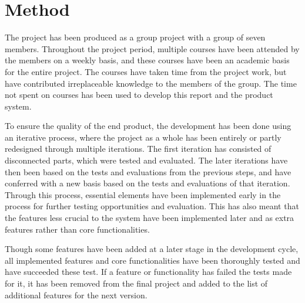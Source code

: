 \section{Method}
The project has been produced as a group project with a group of seven members. Throughout the project period, multiple courses have been attended by the members on a weekly basis, and these courses have been an academic basis for the entire project. The courses have taken time from the project work, but have contributed irreplaceable knowledge to the members of the group. The time not spent on courses has been used to develop this report and the product system.
\par
To ensure the quality of the end product, the development has been done using an iterative process, where the project as a whole has been entirely or partly redesigned through multiple iterations. The first iteration has consisted of disconnected parts, which were tested and evaluated. The later iterations have then been based on the tests and evaluations from the previous steps, and have conferred with a new basis based on the tests and evaluations of that iteration. Through this process, essential elements have been implemented early in the process for further testing opportunities and evaluation. This has also meant that the features less crucial to the system have been implemented later and as extra features rather than core functionalities.
\par
Though some features have been added at a later stage in the development cycle, all implemented features and core functionalities have been thoroughly tested and have succeeded these test. If a feature or functionality has failed the tests made for it, it has been removed from the final project and added to the list of additional features for the next version.